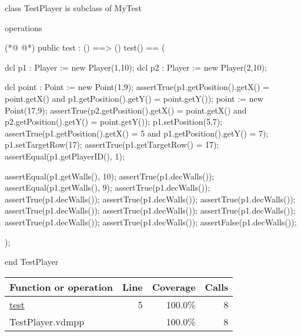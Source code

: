 \begin{vdmpp}[breaklines=true]
class TestPlayer is subclass of MyTest

operations

(*@
\label{test:5}
@*)
 public test : () ==> ()
 test() == 
 (
 
  dcl p1 : Player := new Player(1,10);
  dcl p2 : Player := new Player(2,10);
  
  dcl point : Point := new Point(1,9);
  assertTrue(p1.getPosition().getX() = point.getX() and p1.getPosition().getY() = point.getY());
  point := new Point(17,9);
  assertTrue(p2.getPosition().getX() = point.getX() and p2.getPosition().getY() = point.getY());
  p1.setPosition(5,7);
  assertTrue(p1.getPosition().getX() = 5 and p1.getPosition().getY() = 7);
  p1.setTargetRow(17);
  assertTrue(p1.getTargetRow() = 17);
  assertEqual(p1.getPlayerID(), 1);
  
  assertEqual(p1.getWalls(), 10);
  assertTrue(p1.decWalls());
  assertEqual(p1.getWalls(), 9);
  assertTrue(p1.decWalls());
  assertTrue(p1.decWalls());
  assertTrue(p1.decWalls());
  assertTrue(p1.decWalls());
  assertTrue(p1.decWalls());
  assertTrue(p1.decWalls());
  assertTrue(p1.decWalls());
  assertTrue(p1.decWalls());
  assertTrue(p1.decWalls());
  assertFalse(p1.decWalls());
  
 );

end TestPlayer
\end{vdmpp}
\bigskip
\begin{longtable}{|l|r|r|r|}
\hline
Function or operation & Line & Coverage & Calls \\
\hline
\hline
\hyperref[test:5]{test} & 5&100.0\% & 8 \\
\hline
\hline
TestPlayer.vdmpp & & 100.0\% & 8 \\
\hline
\end{longtable}

